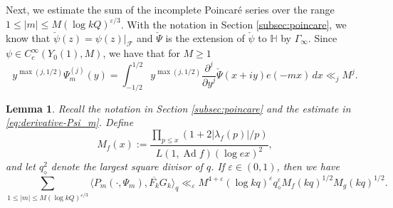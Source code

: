 \documentclass[12pt,reqno]{amsart}
\newtheorem{lem}[thm]{Lemma}
\theoremstyle{remark}
\DeclareMathOperator{\ad}{Ad}
\numberwithin{equation}{section}
\begin{document}
    Next, we estimate the sum of the incomplete Poincar\'e series over the range $1 \le |m| \le M (\log kQ)^{\varepsilon/3}$.
    With the notation in Section \ref{subsec:poincare}, we know that $\check{\psi}(z) = \psi(z)|_{\mathcal{F}}$ and $\check{\Psi}$ is the extension of $\check{\psi}$ to $\mathbb{H}$ by $\Gamma_{\infty}$. 
    Since $\psi \in C_c^{\infty}(Y_0(1),M)$, we have that for $M \ge 1$
	\begin{equation}
        \label{eq:derivative-Psi_m}
		y^{\max(j, 1/2)}\Psi_m^{(j)}(y)= \int_{-1/2}^{1/2} y^{\max(j, 1/2)}\frac{\partial^{j}}{\partial y^{j}}\check{\Psi}(x+iy)e(-mx)\,dx \ll_j M^j.
	\end{equation}
	\begin{lem}\label{lem:H_cor_body}
		Recall the notation in Section \ref{subsec:poincare} and the estimate in \eqref{eq:derivative-Psi_m}. 
        Define
        \[
            M_f(x) := \frac{\prod_{p\le x}(1+2|\lambda_f(p)|/p)}{L(1, \ad f)(\log ex)^2},
	\] 
        and let $q_\diamond^2$ denote the largest square divisor of $q$. If $\varepsilon\in (0,1)$, then we have
		\[
		\sum_{1\leq |m|\le M(\log kQ)^{\varepsilon/3}} \langle P_m(\cdot, \Psi_m), \overline{F_k}G_k \rangle_q \ll_{\varepsilon} M^{4+\varepsilon}(\log kq)^\varepsilon q_\diamond^\varepsilon M_f(kq)^{1/2}M_g(kq)^{1/2}.
		\]
	\end{lem}
\end{document}
